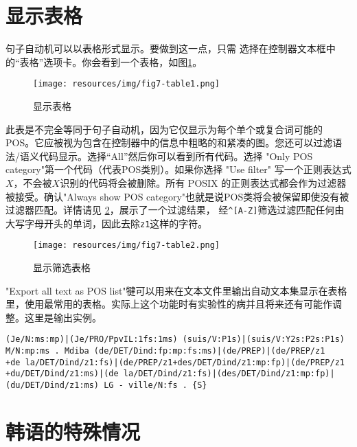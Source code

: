 \section{显示表格}
\label{section-table-display}

句子自动机可以以表格形式显示。要做到这一点，只需
选择在控制器文本框中的“表格”选项卡。你会看到一个表格，如图\ref{fig7-table1}。

\begin{figure}[!ht]
\begin{center}
\texttt{[image: resources/img/fig7-table1.png]}
\caption{显示表格\label{fig7-table1}}
\end{center}
\end{figure}

\bigskip
\noindent 

此表是不完全等同于句子自动机，因为它仅显示为每个单个或复合词可能的POS。它应被视为包含在控制器中的信息中粗略的和紧凑的图。您还可以过滤语法/语义代码显示。选择“All”然后你可以看到所有代码。选择 "Only POS category"第一个代码（代表POS类别）。如果你选择 "Use filter" 
写一个正则表达式$X$，不会被$X$识别的代码将会被删除。所有 POSIX 的正则表达式都会作为过滤器被接受。确认"Always show POS category"也就是说POS类将会被保留即使没有被过滤器匹配。详情请见 \ref{fig7-table2}，展示了一个过滤结果， 经\verb+^[A-Z]+筛选过滤匹配任何由大写字母开头的单词，因此去除\verb+z1+这样的字符。

\begin{figure}[!ht]
\begin{center}
\texttt{[image: resources/img/fig7-table2.png]}
\caption{显示筛选表格\label{fig7-table2}}
\end{center}
\end{figure}
      
\bigskip
\noindent
"Export all text as POS list"犍可以用来在文本文件里输出自动文本集显示在表格里，使用最常用的表格。实际上这个功能时有实验性的病并且将来还有可能作调整。这里是输出实例。

\begin{verbatim}
(Je/N:ms:mp)|(Je/PRO/PpvIL:1fs:1ms) (suis/V:P1s)|(suis/V:Y2s:P2s:P1s) 
M/N:mp:ms . Mdiba (de/DET/Dind:fp:mp:fs:ms)|(de/PREP)|(de/PREP/z1
+de la/DET/Dind/z1:fs)|(de/PREP/z1+des/DET/Dind/z1:mp:fp)|(de/PREP/z1
+du/DET/Dind/z1:ms)|(de la/DET/Dind/z1:fs)|(des/DET/Dind/z1:mp:fp)|
(du/DET/Dind/z1:ms) LG - ville/N:fs . {S}
\end{verbatim}



\section{韩语的特殊情况}
\label{section-korean}

